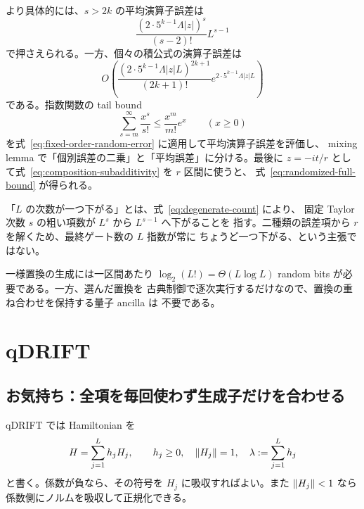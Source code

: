 \documentclass[uplatex,dvipdfmx,11pt,a4paper]{jsarticle}
\begin{document}
より具体的には、$s>2k$ の平均演算子誤差は
\begin{equation}
  \frac{(2\cdot5^{k-1}\Lambda|z|)^s}{(s-2)!}L^{s-1}
  \label{eq:fixed-order-random-error}
\end{equation}
で押さえられる。一方、個々の積公式の演算子誤差は
\begin{equation}
  O\left(
    \frac{(2\cdot5^{k-1}\Lambda|z|L)^{2k+1}}
    {(2k+1)!}
    e^{2\cdot5^{k-1}\Lambda|z|L}
  \right)
\end{equation}
である。指数関数の tail bound
\begin{equation}
  \sum_{s=m}^{\infty}\frac{x^s}{s!}
  \leq\frac{x^m}{m!}e^x
  \qquad(x\geq0)
  \label{eq:exponential-tail}
\end{equation}
を式~\eqref{eq:fixed-order-random-error} に適用して平均演算子誤差を評価し、
mixing lemma で「個別誤差の二乗」と「平均誤差」に分ける。最後に
$z=-it/r$ として式~\eqref{eq:composition-subadditivity} を $r$ 区間に使うと、
式~\eqref{eq:randomized-full-bound} が得られる。

\begin{notebox}[改善の意味]
  「$L$ の次数が一つ下がる」とは、式~\eqref{eq:degenerate-count} により、
  固定 Taylor 次数 $s$ の粗い項数が $L^s$ から $L^{s-1}$ へ下がることを
  指す。二種類の誤差項から $r$ を解くため、最終ゲート数の $L$ 指数が常に
  ちょうど一つ下がる、という主張ではない。
\end{notebox}

一様置換の生成には一区間あたり
$\log_2(L!)=\Theta(L\log L)$ random bits が必要である。一方、選んだ置換を
古典制御で逐次実行するだけなので、置換の重ね合わせを保持する量子 ancilla は
不要である。

\section{qDRIFT}

\subsection{お気持ち：全項を毎回使わず生成子だけを合わせる}

qDRIFT では Hamiltonian を
\begin{equation}
  H=\sum_{j=1}^{L}h_jH_j,
  \qquad
  h_j\geq0,
  \quad \norm{H_j}=1,
  \quad \lambda:=\sum_{j=1}^{L}h_j
  \label{eq:qdrift-decomposition}
\end{equation}
と書く。係数が負なら、その符号を $H_j$ に吸収すればよい。また
$\norm{H_j}<1$ なら係数側にノルムを吸収して正規化できる。
\end{document}
